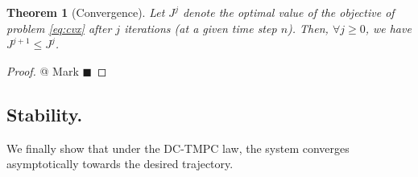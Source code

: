 \documentclass[letterpaper, 10 pt, conference]{ieeeconf}
\newtheorem{theorem}{Theorem}
\begin{document}
\begin{theorem}[Convergence]
\label{th:convergence}
Let $J^{j}$ denote the optimal value of the objective of problem \eqref{eq:cvx} after $j$ iterations (at a given time step $n$). Then, $\forall j \geq 0 $, we have $J^{j+1} \leq J^{j}$.
\end{theorem}

\begin{proof}
@ Mark $\blacksquare$

\end{proof}


\subsection{Stability.} 

We finally show that under the DC-TMPC law, the system converges asymptotically towards the desired trajectory. 
\end{document}
